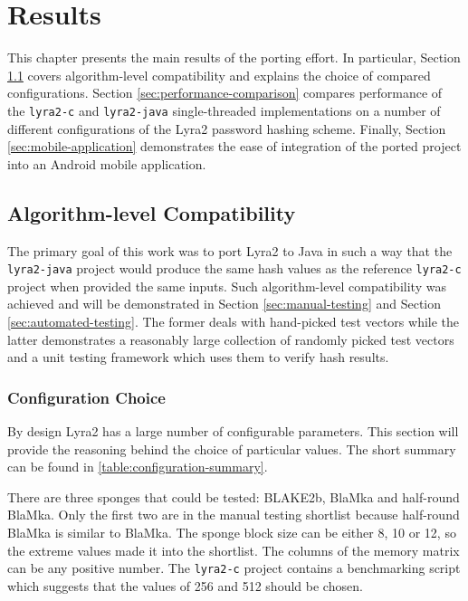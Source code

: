 \chapter{Results}
\label{sec:results}

This chapter presents the main results of the porting effort. In particular, Section \ref{sec:it-works} covers algorithm-level compatibility and explains the choice of compared configurations. Section \ref{sec:performance-comparison} compares performance of the \texttt{lyra2-c} and \texttt{lyra2-java} single-threaded implementations on a number of different configurations of the Lyra2 password hashing scheme. Finally, Section \ref{sec:mobile-application} demonstrates the ease of integration of the ported project into an Android mobile application.

\section{Algorithm-level Compatibility}
\label{sec:it-works}

The primary goal of this work was to port Lyra2 to Java in such a way that the \texttt{lyra2-java} project would produce the same hash values as the reference \texttt{lyra2-c} project when provided the same inputs. Such algorithm-level compatibility was achieved and will be demonstrated in Section \ref{sec:manual-testing} and Section \ref{sec:automated-testing}. The former deals with hand-picked test vectors while the latter demonstrates a reasonably large collection of randomly picked test vectors and a unit testing framework which uses them to verify hash results.

\subsection{Configuration Choice}
By design Lyra2 has a large number of configurable parameters. This section will provide the reasoning behind the choice of particular values. The short summary can be found in \autoref{table:configuration-summary}.

There are three sponges that could be tested: BLAKE2b, BlaMka and half-round BlaMka. Only the first two are in the manual testing shortlist because half-round BlaMka is similar to BlaMka. The sponge block size can be either 8, 10 or 12, so the extreme values made it into the shortlist. The columns of the memory matrix can be any positive number. The \texttt{lyra2-c} project contains a  benchmarking script which suggests that the values of 256 and 512 should be chosen.

